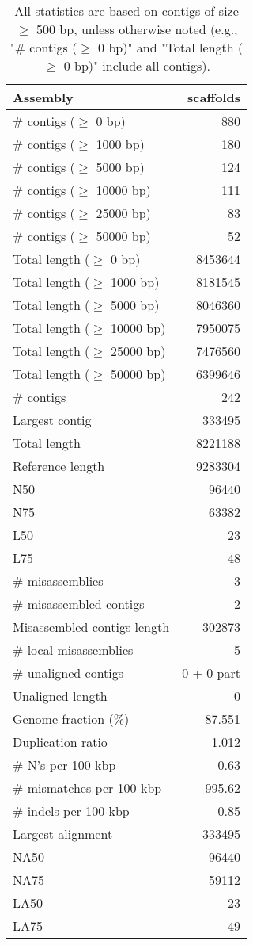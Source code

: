 \documentclass[12pt,a4paper]{article}
\begin{document}
\begin{table}[ht]
\begin{center}
\caption{All statistics are based on contigs of size $\geq$ 500 bp, unless otherwise noted (e.g., "\# contigs ($\geq$ 0 bp)" and "Total length ($\geq$ 0 bp)" include all contigs).}
\begin{tabular}{|l*{1}{|r}|}
\hline
Assembly & scaffolds \\ \hline
\# contigs ($\geq$ 0 bp) & 880 \\ \hline
\# contigs ($\geq$ 1000 bp) & 180 \\ \hline
\# contigs ($\geq$ 5000 bp) & 124 \\ \hline
\# contigs ($\geq$ 10000 bp) & 111 \\ \hline
\# contigs ($\geq$ 25000 bp) & 83 \\ \hline
\# contigs ($\geq$ 50000 bp) & 52 \\ \hline
Total length ($\geq$ 0 bp) & 8453644 \\ \hline
Total length ($\geq$ 1000 bp) & 8181545 \\ \hline
Total length ($\geq$ 5000 bp) & 8046360 \\ \hline
Total length ($\geq$ 10000 bp) & 7950075 \\ \hline
Total length ($\geq$ 25000 bp) & 7476560 \\ \hline
Total length ($\geq$ 50000 bp) & 6399646 \\ \hline
\# contigs & 242 \\ \hline
Largest contig & 333495 \\ \hline
Total length & 8221188 \\ \hline
Reference length & 9283304 \\ \hline
N50 & 96440 \\ \hline
N75 & 63382 \\ \hline
L50 & 23 \\ \hline
L75 & 48 \\ \hline
\# misassemblies & 3 \\ \hline
\# misassembled contigs & 2 \\ \hline
Misassembled contigs length & 302873 \\ \hline
\# local misassemblies & 5 \\ \hline
\# unaligned contigs & 0 + 0 part \\ \hline
Unaligned length & 0 \\ \hline
Genome fraction (\%) & 87.551 \\ \hline
Duplication ratio & 1.012 \\ \hline
\# N's per 100 kbp & 0.63 \\ \hline
\# mismatches per 100 kbp & 995.62 \\ \hline
\# indels per 100 kbp & 0.85 \\ \hline
Largest alignment & 333495 \\ \hline
NA50 & 96440 \\ \hline
NA75 & 59112 \\ \hline
LA50 & 23 \\ \hline
LA75 & 49 \\ \hline
\end{tabular}
\end{center}
\end{table}
\end{document}
